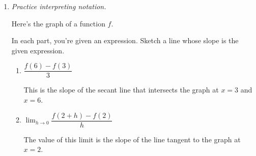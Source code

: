 \documentclass{article}
\begin{document}
\begin{enumerate}[resume]
\item  \emph{Practice interpreting notation.}

  Here's the graph of a function $f$.


  \begin{center}
  \end{center}

  In each part, you're given an expression. Sketch a line whose slope is the given expression.

  \begin{enumerate}
  \item
    \begin{problem}[\vfill]
      $\dfrac{f(6) - f(3)}{3}$
    \end{problem}

    \begin{solution}
    This is the slope of the secant line that intersects the graph at $x=3$ and $x=6$.
      \begin{center}
      \end{center}
    \end{solution}

  \item
    \begin{problem}[\vfill]
      $\displaystyle \lim_{h \to 0} \dfrac{f(2 + h) - f(2)}{h}$ 
    \end{problem}

    \begin{solution}
    The value of this limit is the slope of the line tangent to the graph at $x=2$. 
      \begin{center}
      \end{center}
    \end{solution}


\end{enumerate}
\end{enumerate}
\end{document}
